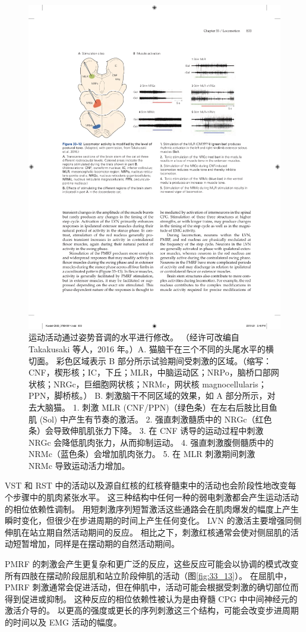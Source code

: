 \begin{figure}[htbp]
	\centering
	\includegraphics[width=0.8\linewidth]{chap33/fig_33_12}
	\caption{运动活动通过姿势音调的水平进行修改。 （经许可改编自 Takakusaki 等人，2016 年。）A. 猫脑干在三个不同的头尾水平的横切面。 彩色区域表示 B 部分所示试验期间受刺激的区域。（缩写：CNF，楔形核；IC，下丘；MLR，中脑运动区；NRPo，脑桥口部网状核；NRGc，巨细胞网状核；NRMc，网状核 magnocellularis；PPN，脚桥核。） B. 刺激脑干不同区域的效果，如 A 部分所示，对去大脑猫。 1. 刺激 MLR (CNF/PPN)（绿色条）在左右后肢比目鱼肌 (Sol) 中产生有节奏的激活。 2. 强直刺激髓质中的 NRGc（红色条）会导致伸肌肌张力下降。 3. 在 CNF 诱导的运动过程中刺激 NRGc 会降低肌肉张力，从而抑制运动。 4. 强直刺激腹侧髓质中的 NRMc（蓝色条）会增加肌肉张力。 5. 在 MLR 刺激期间刺激 NRMc 导致运动活力增加。}
	\label{fig:33_12}
\end{figure}


VST 和 RST 中的活动以及源自红核的红核脊髓束中的活动也会阶段性地改变每个步骤中的肌肉紧张水平。
这三种结构中任何一种的弱电刺激都会产生运动活动的相位依赖性调制。
用短刺激序列短暂激活这些通路会在肌肉爆发的幅度上产生瞬时变化，但很少在步进周期的时间上产生任何变化。
LVN 的激活主要增强同侧伸肌在站立期自然活动期间的反应。
相比之下，刺激红核通常会使对侧屈肌的活动短暂增加，同样是在摆动期的自然活动期间。


PMRF 的刺激会产生更复杂和更广泛的反应，这些反应可能会以协调的模式改变所有四肢在摆动阶段屈肌和站立阶段伸肌的活动（图\ref{fig:33_13}）。
在屈肌中，PMRF 刺激通常会促进活动，但在伸肌中，活动可能会根据受刺激的确切部位而得到促进或抑制。
这种反应的相位依赖性被认为是由脊髓 CPG 中中间神经元的激活介导的。
以更高的强度或更长的序列刺激这三个结构，可能会改变步进周期的时间以及 EMG 活动的幅度。



